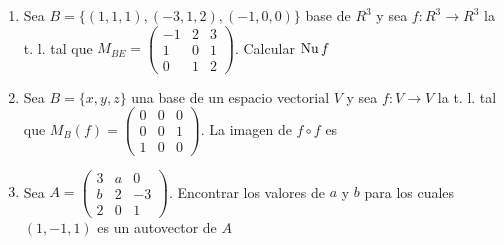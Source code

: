 \documentclass[../practica.root.tex]{subfiles}
\begin{document}
\begin{enumerate}
    \item Sea $B = \{(1,1,1),(-3,1,2),(-1,0,0)\}$ base de $R^3$ y sea $f : R^3 \to R^3$ la t. l. tal que $M_{BE} = \begin{pmatrix}
                  -1 & 2 & 3 \\ 1 & 0 & 1 \\ 0 & 1 & 2
              \end{pmatrix}$.
          Calcular $\operatorname{Nu} f$

    \item Sea $B = \{x,y,z\}$ una base de un espacio vectorial $V$ y sea $f : V \to V$ la t. l. tal que $M_B(f) = \begin{pmatrix}
                  0 & 0 & 0 \\ 0 & 0 & 1 \\ 1 & 0 & 0
              \end{pmatrix}$. La imagen de $f \circ f$ es

    \item Sea $A = \begin{pmatrix}
                  3 & a & 0 \\ b & 2 & -3 \\ 2 & 0 & 1
              \end{pmatrix}$. Encontrar los valores de $a$ y $b$ para los cuales $(1,-1,1)$ es un autovector de $A$


\end{enumerate}
\end{document}
